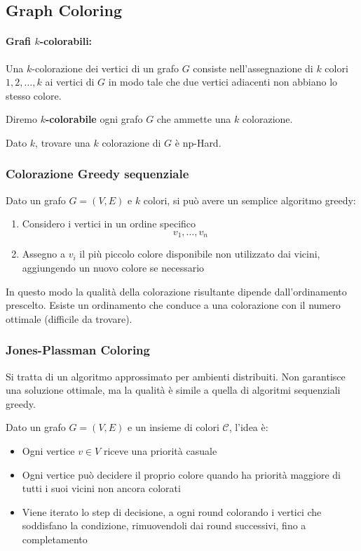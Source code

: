 \subsection{Graph Coloring}

\paragraph{Grafi $k$-colorabili:} Una $k$-colorazione dei vertici di un grafo $G$ consiste nell'assegnazione di $k$ colori $1, 2, \dots, k$ ai vertici di $G$ in modo tale che due vertici adiacenti non abbiano lo stesso colore.

Diremo \textbf{$k$-colorabile} ogni grafo $G$ che ammette una $k$ colorazione.

Dato $k$, trovare una $k$ colorazione di $G$ è np-Hard.

\subsubsection{Colorazione Greedy sequenziale}

Dato un grafo $G = (V,E)$ e $k$ colori, si può avere un semplice algoritmo greedy:
\begin{enumerate}
    \item Considero i vertici in un ordine specifico
    $$ v_1, \dots, v_n $$
    
    \item Assegno a $v_i$ il più piccolo colore disponibile non utilizzato dai vicini, aggiungendo un nuovo colore se necessario
\end{enumerate}

In questo modo la qualità della colorazione risultante dipende dall'ordinamento prescelto. Esiste un ordinamento che conduce a una colorazione con il numero ottimale (difficile da trovare).

\subsubsection{Jones-Plassman Coloring}

Si tratta di un algoritmo approssimato per ambienti distribuiti. Non garantisce una soluzione ottimale, ma la qualità è simile a quella di algoritmi sequenziali greedy.

Dato un grafo $G = (V,E)$ e un insieme di colori $\mathcal{C}$, l'idea è:
\begin{itemize}
    \item Ogni vertice $v \in V$ riceve una priorità casuale
    
    \item Ogni vertice può decidere il proprio colore quando ha priorità maggiore di tutti i suoi vicini non ancora colorati
    
    \item Viene iterato lo step di decisione, a ogni round colorando i vertici che soddisfano la condizione, rimuovendoli dai round successivi, fino a completamento 
\end{itemize}

